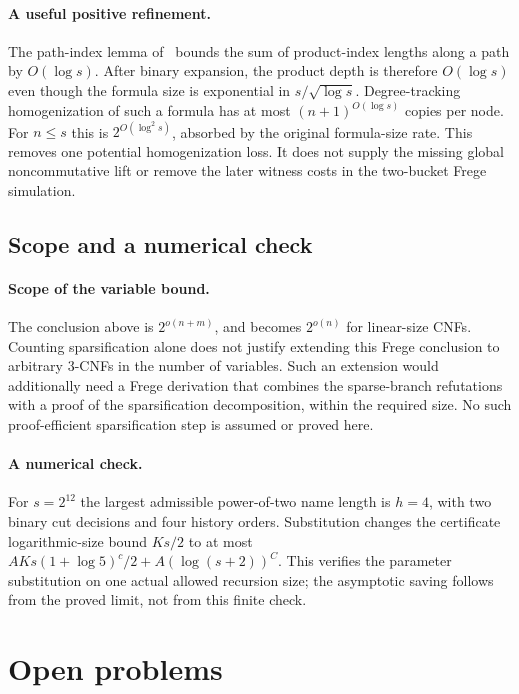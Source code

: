 \documentclass[11pt]{article}
\theoremstyle{definition}
\theoremstyle{remark}
\begin{document}
\paragraph{A useful positive refinement.}
The path-index lemma of~\cite{Cruz26} bounds the sum of product-index
lengths along a path by $O(\log s)$. After binary expansion, the
product depth is therefore $O(\log s)$ even though the formula size is
exponential in $s/\sqrt{\log s}$. Degree-tracking homogenization of
such a formula has at most $(n+1)^{O(\log s)}$ copies per node. For
$n\le s$ this is $2^{O(\log^2s)}$, absorbed by the original
formula-size rate. This removes one potential homogenization loss. It
does not supply the missing global noncommutative lift or remove the
later witness costs in the two-bucket Frege simulation.

\subsection{Scope and a numerical check}

\paragraph{Scope of the variable bound.}
The conclusion above is $2^{o(n+m)}$, and becomes $2^{o(n)}$ for
linear-size CNFs. Counting sparsification alone does not justify
extending this Frege conclusion to arbitrary 3-CNFs in the number
of variables. Such an extension would additionally need a Frege
derivation that combines the sparse-branch refutations with a
proof of the sparsification decomposition, within the required
size. No such proof-efficient sparsification step is assumed or
proved here.

\paragraph{A numerical check.}
For $s=2^{12}$ the largest admissible power-of-two name length is
$h=4$, with two binary cut decisions and four history orders.
Substitution changes the certificate logarithmic-size bound
$Ks/2$ to at most
$AKs(1+\log5)^c/2+A(\log(s+2))^C$. This verifies the
parameter substitution on one actual allowed recursion size;
the asymptotic saving follows from the proved limit, not from
this finite check.

\section{Open problems}
\label{sec:open-map}
\end{document}
